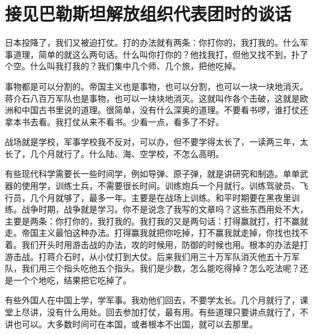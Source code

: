 \section[接见巴勒斯坦解放组织代表团时的谈话（一九六五年三月）]{接见巴勒斯坦解放组织代表团时的谈话}


日本投降了，我们又被迫打仗。打的办法就有两条：你打你的，我打我的。什么军事道理，简单的就这么两句话。什么叫你打你的？他找我打，但他又找不到，扑了个空。什么叫我打我的？我们集中几个师、几个旅，把他吃掉。

事物都是可以分割的。帝国主义也是事物，也可以分割，也可以一块一块地消灭。蒋介石八百万军队也是事物，也可以一块块地消灭。这就叫作各个击破，这就是欧洲和中国古书里说的道理。很简单，没有什么深奥的道理。不要看书啰，谁打仗还拿本书去看。我打仗从来不看书。少看一点，看多了不好。

战场就是学校，军事学校我不反对，可以办，但不要学得太长了，一读两三年，太长了，几个月就行了。什么陆、海、空学校，不怎么高明。

有些现代科学需要长一些时间学，例如导弹、原子弹，就是讲研究和制造。单单武器的使用学，训练士兵，不需要很长时间。训练炮兵一个月就行。训练驾驶员、飞行员，几个月就够了，最多一年。主要是在战场上训练。和平时期要在黑夜里训练。战争时期，战争就是学习。你不是说念了我写的文章吗？这些东西用处不大，主要是两条：你打你的，我打我的。我打我的又是两句话：打得赢就打，打不赢就走。帝国主义最怕这种办法。打得赢我就把你吃掉，打不赢我就走掉，你找也找不着。我们开头时用游击战的办法，攻的时候用，防御的时候也用。根本的办法是打游击战。打蒋介石时，从小仗打到大仗。后来我们用三十万军队消灭他五十万军队，我们用三个指头吃他五个指头。我们是少数，怎么能吃得掉？怎么吃法呢？还是一个个地吃，结果把它吃掉了。

有些外国人在中国上学，学军事。我劝他们回去，不要学太长。几个月就行了，课堂上尽讲，没有什么用处。回去参加打仗，最有用。有些道理只要讲点就行了，不讲也可以。大多数时间可在本国，或者根本不出国，就可以去那里。

